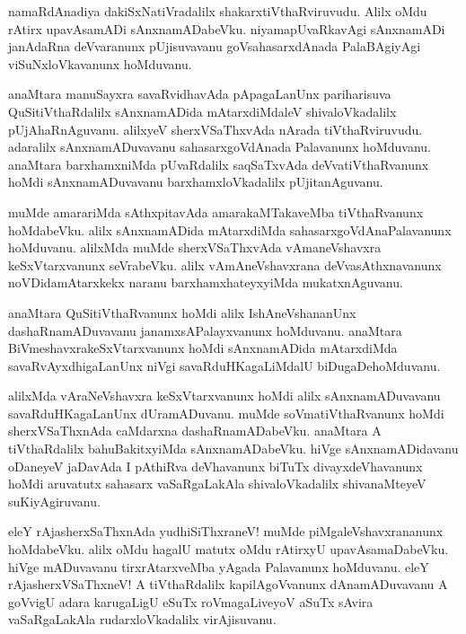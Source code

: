 \documentclass{article}
\begin{document}
\begin{mn}
namaRdAnadiya dakiSxNatiVradalilx shakarxtiVthaRviruvudu. Alilx oMdu rAtirx upavAsamADi
sAnxnamADabeVku. niyamapUvaRkavAgi sAnxnamADi janAdaRna deVvaranunx pUjisuvavanu 
goVsahasarxdAnada PalaBAgiyAgi viSuNxloVkavanunx hoMduvanu.
\end{mn}

\begin{mn}
anaMtara manuSayxra savaRvidhavAda pApagaLanUnx pariharisuva QuSitiVthaRdalilx sAnxnamADida  
mAtarxdiMdaleV shivaloVkadalilx pUjAhaRnAguvanu. alilxyeV sherxVSaThxvAda nArada tiVthaRviruvudu. 
adaralilx sAnxnamADuvavanu sahasarxgoVdAnada Palavanunx  hoMduvanu. anaMtara barxhamxniMda 
pUvaRdalilx saqSaTxvAda deVvatiVthaRvanunx hoMdi sAnxnamADuvavanu barxhamxloVkadalilx 
pUjitanAguvanu.
\end{mn}

\begin{mn}
muMde amarariMda sAthxpitavAda amarakaMTakaveMba tiVthaRvanunx hoMdabeVku. alilx sAnxnamADida 
mAtarxdiMda sahasarxgoVdAnaPalavanunx hoMduvanu. alilxMda muMde  sherxVSaThxvAda vAmaneVshavxra 
keSxVtarxvanunx seVrabeVku. alilx vAmAneVshavxrana deVvasAthxnavanunx noVDidamAtarxkekx naranu 
barxhamxhateyxyiMda mukatxnAguvanu.
\end{mn}

\begin{mn}
anaMtara QuSitiVthaRvanunx hoMdi alilx IshAneVshananUnx dashaRnamADuvavanu janamxsAPalayxvanunx
hoMduvanu. anaMtara BiVmeshavxrakeSxVtarxvanunx  hoMdi sAnxnamADida mAtarxdiMda 
savaRvAyxdhigaLanUnx  niVgi savaRduHKagaLiMdalU biDugaDehoMduvanu.
\end{mn}

\begin{mn}
alilxMda vAraNeVshavxra keSxVtarxvanunx hoMdi alilx sAnxnamADuvavanu savaRduHKagaLanUnx 
dUramADuvanu. muMde soVmatiVthaRvanunx hoMdi sherxVSaThxnAda caMdarxna dashaRnamADabeVku. 
anaMtara A tiVthaRdalilx bahuBakitxyiMda sAnxnamADabeVku. hiVge sAnxnamADidavanu oDaneyeV jaDavAda
I pAthiRva deVhavanunx biTuTx divayxdeVhavanunx hoMdi aruvatutx sahasarx vaSaRgaLakAla 
shivaloVkadalilx  shivanaMteyeV suKiyAgiruvanu.
\end{mn}

\begin{mn}
eleY rAjasherxSaThxnAda yudhiSiThxraneV! muMde piMgaleVshavxrananunx hoMdabeVku.
alilx oMdu hagalU matutx oMdu rAtirxyU upavAsamaDabeVku. hiVge mADuvavanu tirxrAtarxveMba yAgada 
Palavanunx hoMduvanu. eleY rAjasherxVSaThxneV! A tiVthaRdalilx  kapilAgoVvanunx 
dAnamADuvavanu A goVvigU adara karugaLigU eSuTx roVmagaLiveyoV aSuTx sAvira vaSaRgaLakAla
rudarxloVkadalilx virAjisuvanu.
\end{mn}
\end{document}
